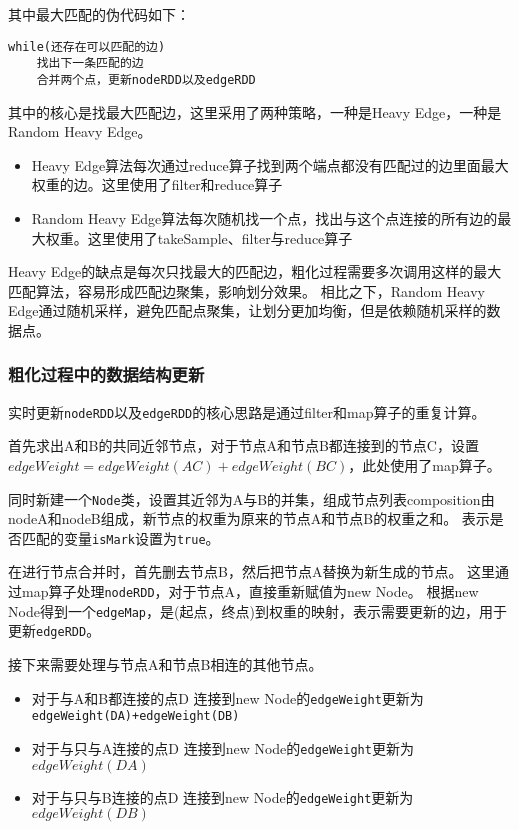 其中最大匹配的伪代码如下：

\begin{lstlisting}
while(还存在可以匹配的边)
    找出下一条匹配的边
    合并两个点，更新nodeRDD以及edgeRDD
\end{lstlisting}

其中的核心是找最大匹配边，这里采用了两种策略，一种是Heavy Edge，一种是Random Heavy Edge。
\begin{itemize}
    \item Heavy Edge算法每次通过reduce算子找到两个端点都没有匹配过的边里面最大权重的边。这里使用了filter和reduce算子
    \item Random Heavy Edge算法每次随机找一个点，找出与这个点连接的所有边的最大权重。这里使用了takeSample、filter与reduce算子
\end{itemize}

Heavy Edge的缺点是每次只找最大的匹配边，粗化过程需要多次调用这样的最大匹配算法，容易形成匹配边聚集，影响划分效果。
相比之下，Random Heavy Edge通过随机采样，避免匹配点聚集，让划分更加均衡，但是依赖随机采样的数据点。

\subsubsection{粗化过程中的数据结构更新}

实时更新\texttt{nodeRDD}以及\texttt{edgeRDD}的核心思路是通过filter和map算子的重复计算。

首先求出A和B的共同近邻节点，对于节点A和节点B都连接到的节点C，设置$edgeWeight=edgeWeight(AC)+edgeWeight(BC)$，此处使用了map算子。

同时新建一个\texttt{Node}类，设置其近邻为A与B的并集，组成节点列表composition由nodeA和nodeB组成，新节点的权重为原来的节点A和节点B的权重之和。
表示是否匹配的变量\texttt{isMark}设置为\texttt{true}。

在进行节点合并时，首先删去节点B，然后把节点A替换为新生成的节点。
这里通过map算子处理\texttt{nodeRDD}，对于节点A，直接重新赋值为new Node。
根据new Node得到一个\texttt{edgeMap}，是(起点，终点)到权重的映射，表示需要更新的边，用于更新\texttt{edgeRDD}。

接下来需要处理与节点A和节点B相连的其他节点。
\begin{itemize}
    \item 对于与A和B都连接的点D
        连接到new Node的\texttt{edgeWeight}更新为\texttt{edgeWeight(DA)+edgeWeight(DB)}
    \item 对于与只与A连接的点D
        连接到new Node的\texttt{edgeWeight}更新为$edgeWeight(DA)$
    \item 对于与只与B连接的点D
        连接到new Node的\texttt{edgeWeight}更新为$edgeWeight(DB)$
\end{itemize}

